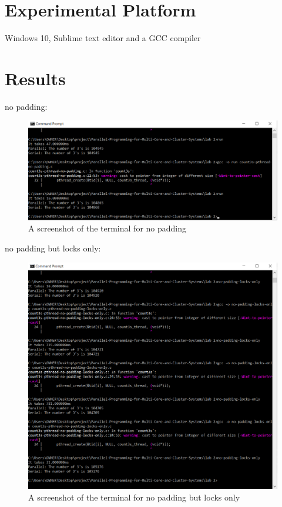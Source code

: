 \documentclass[10pt,a4paper]{article} %
\begin{document}
\section{Experimental Platform}
Windows 10, Sublime text editor and a GCC compiler

\section{Results}

no padding:

\begin{figure}[htp]
    \centering
    \includegraphics[width=12cm]{no-padding.png}
    \caption{A screenshot of the terminal for no padding}
    \label{fig:termianl}
\end{figure}

no padding but locks only:

\begin{figure}[htp]
    \centering
    \includegraphics[width=12cm]{no-padding-locks.png}
    \caption{A screenshot of the terminal for no padding but locks only}
    \label{fig:termianl}
\end{figure}
\end{document}
